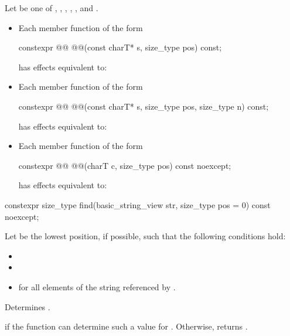 \pnum
Let  be one of
,
,
,
,
,
and
.
\begin{itemize}
\item
Each member function of the form
\begin{codeblock}
constexpr @@ @@(const charT* s, size_type pos) const;
\end{codeblock}
has effects equivalent to: 

\item
Each member function of the form
\begin{codeblock}
constexpr @@ @@(const charT* s, size_type pos, size_type n) const;
\end{codeblock}
has effects equivalent to: 

\item
Each member function of the form
\begin{codeblock}
constexpr @@ @@(charT c, size_type pos) const noexcept;
\end{codeblock}
has effects equivalent to: 
\end{itemize}

%
\begin{itemdecl}
constexpr size_type find(basic_string_view str, size_type pos = 0) const noexcept;
\end{itemdecl}

\begin{itemdescr}
\pnum
Let  be the lowest position, if possible, such that the following conditions hold:
\begin{itemize}
\item
{}
\item
{}
\item
{} for all elements  of the string referenced by .
\end{itemize}

\pnum
\effects
Determines .

\pnum
\returns
{} if the function can determine such a value for .
Otherwise, returns .
\end{itemdescr}

